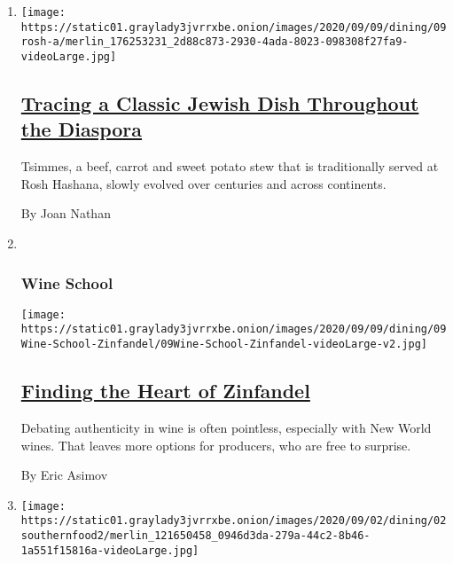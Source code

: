 \begin{enumerate}
\def\labelenumi{\arabic{enumi}.}
\item
  \texttt{[image: https://static01.graylady3jvrrxbe.onion/images/2020/09/09/dining/09rosh-a/merlin\_176253231\_2d88c873-2930-4ada-8023-098308f27fa9-videoLarge.jpg]}

  \hypertarget{tracing-a-classic-jewish-dish-throughout-the-diaspora}{%
  \subsection{\texorpdfstring{\href{/2020/09/08/dining/tsimmes-recipe-rosh-hashanah.html}{Tracing
  a Classic Jewish Dish Throughout the
  Diaspora}}{Tracing a Classic Jewish Dish Throughout the Diaspora}}\label{tracing-a-classic-jewish-dish-throughout-the-diaspora}}

  Tsimmes, a beef, carrot and sweet potato stew that is traditionally
  served at Rosh Hashana, slowly evolved over centuries and across
  continents.

  By Joan Nathan
\item ~
  \hypertarget{wine-school}{%
  \subsubsection{Wine School}\label{wine-school}}

  \texttt{[image: https://static01.graylady3jvrrxbe.onion/images/2020/09/09/dining/09Wine-School-Zinfandel/09Wine-School-Zinfandel-videoLarge-v2.jpg]}

  \hypertarget{finding-the-heart-of-zinfandel}{%
  \subsection{\texorpdfstring{\href{/2020/09/03/dining/drinks/wine-school-zinfandel.html}{Finding
  the Heart of
  Zinfandel}}{Finding the Heart of Zinfandel}}\label{finding-the-heart-of-zinfandel}}

  Debating authenticity in wine is often pointless, especially with New
  World wines. That leaves more options for producers, who are free to
  surprise.

  By Eric Asimov
\item
  \texttt{[image: https://static01.graylady3jvrrxbe.onion/images/2020/09/02/dining/02southernfood2/merlin\_121650458\_0946d3da-279a-44c2-8b46-1a551f15816a-videoLarge.jpg]}

  \hypertarget{its-leader-under-fire-a-southern-food-group-vows-to-examine-racism}{%
}
\end{enumerate}
